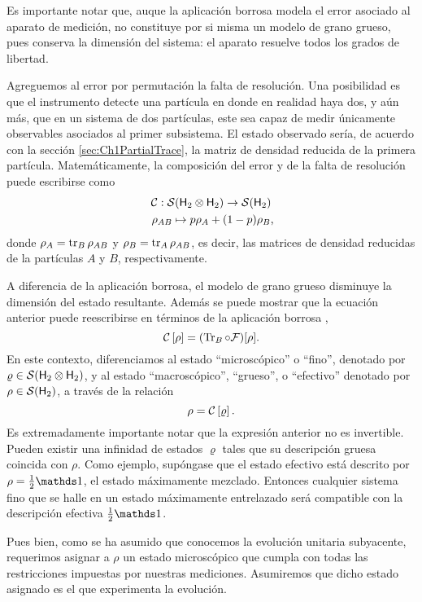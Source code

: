 Es importante notar que, auque la aplicación borrosa modela el error asociado al aparato de medición, no constituye por si misma un modelo de grano grueso, pues conserva la dimensión del sistema: el aparato resuelve todos los grados de libertad.

Agreguemos al error por permutación la falta de resolución. Una posibilidad es que el instrumento detecte una partícula en donde en realidad haya dos, y aún más, que en un sistema de dos partículas, este sea capaz de medir únicamente observables asociados al primer subsistema. El estado observado sería, de acuerdo con la sección \ref{sec:Ch1PartialTrace}, la matriz de densidad reducida de la primera partícula. Matemáticamente, la composición del error y de la falta de resolución puede escribirse como
\begin{gather*}
    \mcC:\mcS(\hilbert_2 \otimes \hilbert_2)\to \mcS(\hilbert_2)\nonumber\\
    \rho_{AB} \mapsto p\rho_A+(1-p)\rho_B\rlap{,}
\end{gather*}
donde $\rho_A=\tr_B \rho_{AB}$ y $\rho_B=\tr_A \rho_{AB}$, es decir, las matrices de densidad reducidas de la partículas $A$ y $B$, respectivamente.


A diferencia de la aplicación borrosa, el modelo de grano grueso disminuye la dimensión del estado resultante. Además se puede mostrar que la ecuación anterior puede reescribirse en términos de la aplicación borrosa \cite{FuzzyMeasurements},
\begin{equation*}
\mathcal{C}\left[\rho\right]=(\Tr_{B}\circ\mathcal{F})[\rho].
\end{equation*}
En este contexto, diferenciamos al estado ``microscópico'' o ``fino'', denotado por $\varrho\in \mathcal{S}({\sf H}_2\otimes{\sf H}_2)$, y al estado ``macroscópico'', ``grueso'', o  ``efectivo'' denotado por $\rho\in \mathcal{S}({\sf H}_2)$, a través de la relación
\begin{equation*}
    \rho=\mathcal{C}\left[\varrho\right].
\end{equation*}
Es extremadamente importante notar que la expresión anterior no es invertible. Pueden existir una infinidad de estados $\varrho$ tales que su descripción gruesa coincida con $\rho$. Como ejemplo, supóngase que el estado efectivo está descrito por $\rho=\frac{1}{2}\Id$, el estado máximamente mezclado. Entonces cualquier sistema fino que se halle en un estado máximamente entrelazado será compatible con la descripción efectiva $\frac{1}{2}\Id$.

Pues bien, como se ha asumido que conocemos la evolución unitaria subyacente, requerimos asignar a $\rho$ un estado microscópico que cumpla con todas las restricciones impuestas por nuestras mediciones. Asumiremos que dicho estado asignado es el que experimenta la evolución. 


